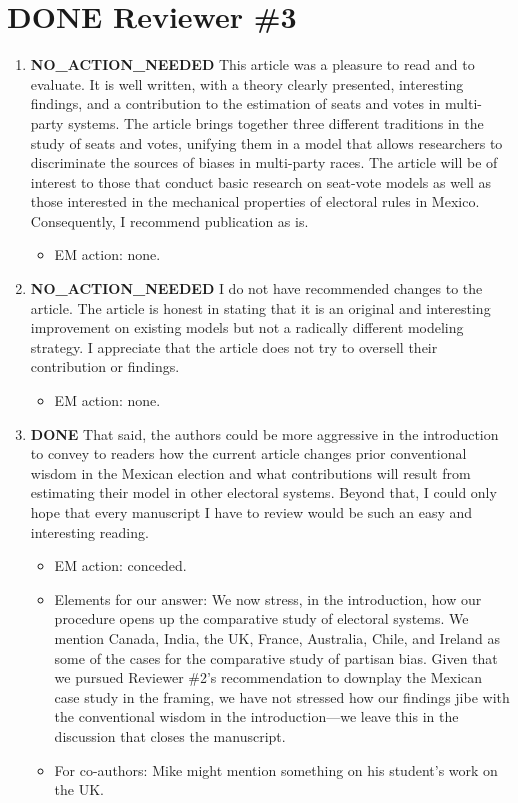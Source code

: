 \documentclass{article}
\begin{document}
\section{{\bfseries\sffamily DONE} Reviewer \#3}
\label{sec:orgheadline19}
\begin{enumerate}
\item {\bfseries\sffamily NO\_ACTION\_NEEDED} This article was a pleasure to read and to evaluate. It is well written, with a theory clearly presented, interesting findings, and a contribution to the estimation of seats and votes in multi-party systems. The article brings together three different traditions in the study of seats and votes, unifying them in a model that allows researchers to discriminate the sources of biases in multi-party races. The article will be of interest to those that conduct basic research on seat-vote models as well as those interested in the mechanical properties of electoral rules in Mexico. Consequently, I recommend publication as is.
\label{sec:orgheadline16}
\begin{itemize}
\item EM action: none.
\end{itemize}
\item {\bfseries\sffamily NO\_ACTION\_NEEDED} I do not have recommended changes to the article. The article is honest in stating that it is an original and interesting improvement on existing models but not a radically different modeling strategy. I appreciate that the article does not try to oversell their contribution or findings.
\label{sec:orgheadline17}
\begin{itemize}
\item EM action: none.
\end{itemize}
\item {\bfseries\sffamily DONE} That said, the authors could be more aggressive in the introduction to convey to readers how the current article changes prior conventional wisdom in the Mexican election and what contributions will result from estimating their model in other electoral systems. Beyond that, I could only hope that every manuscript I have to review would be such an easy and interesting reading.
\label{sec:orgheadline18}
\begin{itemize}
\item EM action: conceded.
\item Elements for our answer: We now stress, in the introduction, how our procedure opens up the comparative study of electoral systems. We mention Canada, India, the UK, France, Australia, Chile, and Ireland as some of the cases for the comparative study of partisan bias. Given that we pursued Reviewer \#2's recommendation to downplay the Mexican case study in the framing, we have not stressed how our findings jibe with the conventional wisdom in the introduction---we leave this in the discussion that closes the manuscript.
\item For co-authors: Mike might mention something on his student's work on the UK.
\end{itemize}
\end{enumerate}
\end{document}
